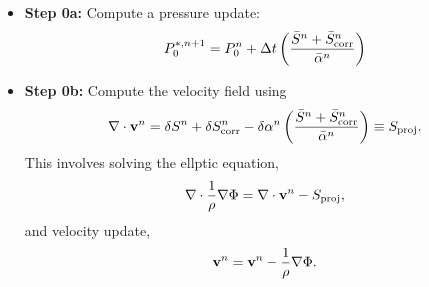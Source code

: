 \documentclass[final]{siamltex}
\def\vb {{\bf v}}
\begin{document}
\begin{itemize}
\item {\bf Step 0a:} Compute a pressure update:
\begin{equation}
P_0^{*,n+1} = P_0^n + \Delta t\left(\frac{\bar{S}^n + \bar{S}_{\rm corr}^n}{\bar{\alpha}^n}\right)
\end{equation}
\item {\bf Step 0b:} Compute the velocity field using
\begin{equation}
\nabla\cdot\vb^n = \delta S^n + \delta S_{\rm corr}^n - \delta\alpha^n\left(\frac{\bar{S}^n + \bar{S}_{\rm corr}^n}{\bar{\alpha}^n}\right) \equiv S_{\rm proj}.
\end{equation}
This involves solving the ellptic equation,
\begin{equation}
\nabla\cdot\frac{1}{\rho}\nabla\Phi = \nabla\cdot\vb^n - S_{\rm proj},
\end{equation}
and velocity update,
\begin{equation}
\vb^n = \vb^n - \frac{1}{\rho}\nabla\Phi.
\end{equation}


\end{itemize}
\end{document}
